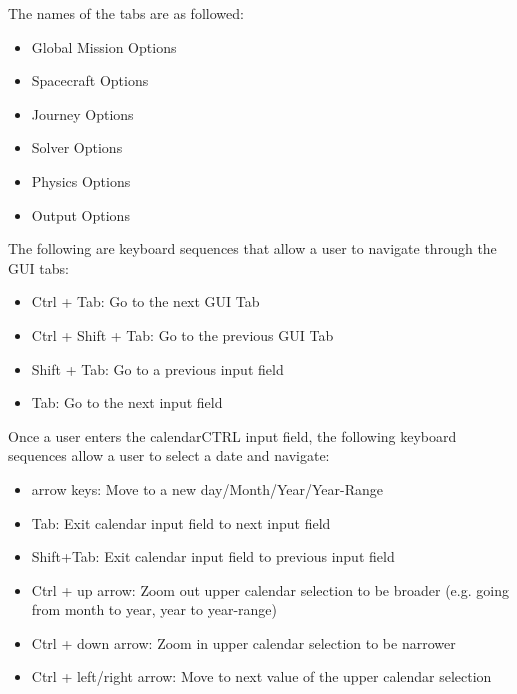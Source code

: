 \noindent The names of the tabs are as followed:
\begin{itemize}
	\item Global Mission Options
	\item Spacecraft Options
	\item Journey Options
	\item Solver Options
	\item Physics Options
	\item Output Options
\end{itemize}

\noindent The following are keyboard sequences that allow a user to navigate through the \ac{GUI} tabs:
\begin{itemize}
	\item Ctrl + Tab: Go to the next GUI Tab
	\item Ctrl + Shift + Tab: Go to the previous GUI Tab
	\item Shift + Tab: Go to a previous input field
	\item Tab: Go to the next input field
\end{itemize}

\noindent Once a user enters the calendarCTRL input field, the following keyboard sequences allow a user to select a date and navigate:
\begin{itemize}
	\item arrow keys: Move to a new day/Month/Year/Year-Range
	\item Tab: Exit calendar input field to next input field
	\item Shift+Tab: Exit calendar input field to previous input field
	\item Ctrl + up arrow: Zoom out upper calendar selection to be broader (e.g. going from month to year, year to year-range)
	\item Ctrl + down arrow: Zoom in upper calendar  selection to be narrower 
	\item Ctrl + left/right arrow: Move to next value of the upper calendar selection
\end{itemize}